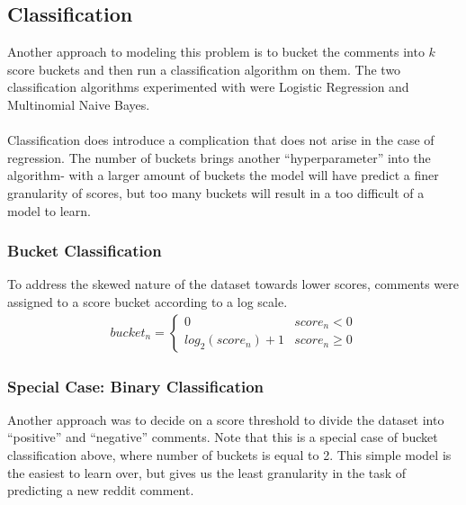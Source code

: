 \documentclass[11pt, twocolumn]{article}
\begin{document}
	\subsection{Classification}
	Another approach to modeling this problem is to bucket the comments into $k$ score buckets and then run a classification algorithm on them. The two classification algorithms experimented with were Logistic Regression and Multinomial Naive Bayes. \\
	\\ 
	Classification does introduce a complication that does not arise in the case of regression. The number of buckets brings another ``hyperparameter'' into the algorithm- with a larger amount of buckets the model will have predict a finer granularity of scores, but too many buckets will result in a too difficult of a model to learn. 
		
		\subsubsection{Bucket Classification}
		To address the skewed nature of the dataset towards lower scores, comments were assigned to a score bucket according to a log scale.
		\begin{gather*}
			bucket_n = \begin{cases}
				0 & score_n < 0 \\
				log_2(score_n) + 1 & score_n \geq 0
				 \end{cases}
		\end{gather*}
	
	
		\subsubsection{Special Case: Binary Classification}
		Another approach was to decide on a score threshold to divide the dataset into ``positive'' and ``negative'' comments. Note that this is a special case of bucket classification above, where number of buckets is equal to 2. This simple model is the easiest to learn over, but gives us the least granularity in the task of predicting a new reddit comment.
\end{document}
